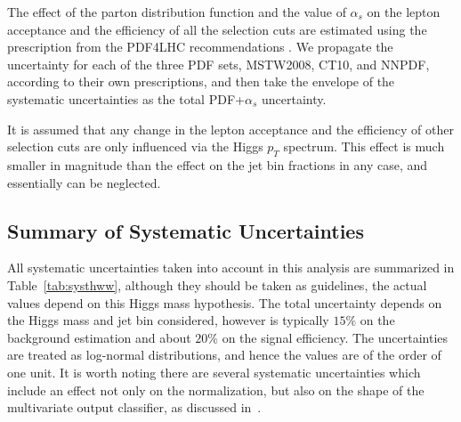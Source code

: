 The effect of the parton distribution function and the value of $\alpha_{s}$
 on the lepton acceptance and the efficiency of all the selection cuts are 
estimated using the prescription from the PDF4LHC recommendations \cite{PDF4LHC}. We 
propagate the uncertainty for each of the three PDF sets, MSTW2008, CT10, and
NNPDF, according to their own prescriptions, and then take the envelope
of the systematic uncertainties as the total PDF+$\alpha_{s}$  uncertainty. 

It is assumed that any change in the
lepton acceptance and the efficiency of other selection cuts are only
influenced via the Higgs $p_{T}$ spectrum. This effect is much smaller in 
magnitude than the effect on the jet bin fractions in any case, and 
essentially can be neglected.



\subsection{Summary of Systematic Uncertainties}
All systematic uncertainties taken into account in this analysis
are summarized in Table~\ref{tab:systhww}, although they should be taken as 
guidelines, the actual values depend on this Higgs mass hypothesis. 
The total uncertainty depends on the Higgs mass and jet bin considered,
however is typically $15\%$ on the background estimation and about $20\%$ 
on the signal efficiency. The uncertainties are treated as log-normal 
distributions, and hence the values are of the order of one unit. It is worth 
noting there are several systematic uncertainties which include an effect 
not only on the normalization, but also on the shape of the multivariate output 
classifier, as discussed in~\cite{MVASyst}.


